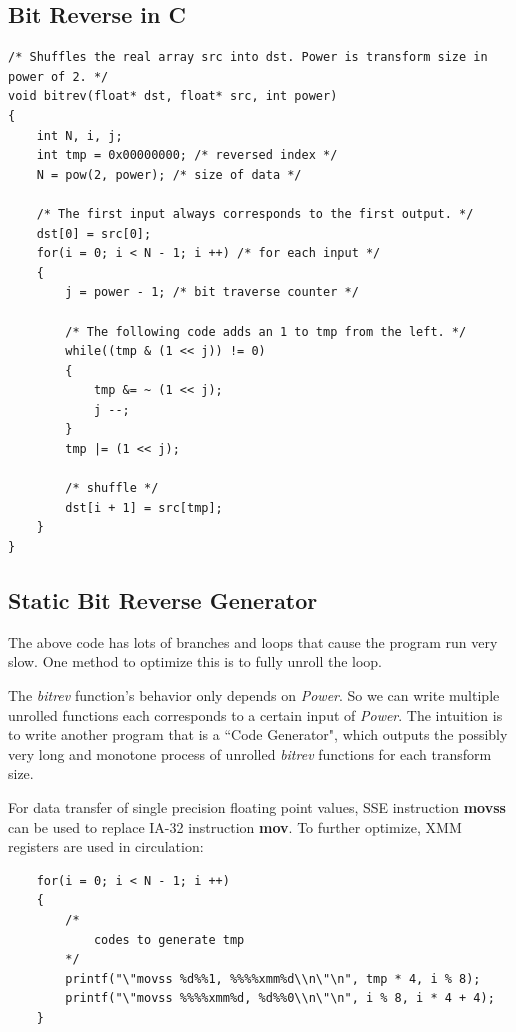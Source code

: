 \documentclass[a4paper]{report}
\begin{document}
\subsection{Bit Reverse in C} \indent

        \lstset{language = c, tabsize = 4}
        \begin{lstlisting}
/* Shuffles the real array src into dst. Power is transform size in power of 2. */
void bitrev(float* dst, float* src, int power)
{
    int N, i, j;
    int tmp = 0x00000000; /* reversed index */
    N = pow(2, power); /* size of data */
    
    /* The first input always corresponds to the first output. */
    dst[0] = src[0];
    for(i = 0; i < N - 1; i ++) /* for each input */
    {
        j = power - 1; /* bit traverse counter */
        
        /* The following code adds an 1 to tmp from the left. */
        while((tmp & (1 << j)) != 0)
        {
            tmp &= ~ (1 << j);
            j --;
        }
        tmp |= (1 << j);
        
        /* shuffle */
        dst[i + 1] = src[tmp];
    }
}
        \end{lstlisting}

\subsection{Static Bit Reverse Generator} \indent

	The above code has lots of branches and loops that cause the program run very slow. One method to optimize this is to fully unroll the loop.
	
	The \textit{bitrev} function's behavior only depends on \textit{Power}. So we can write multiple unrolled functions each corresponds to a certain input of \textit{Power}. The intuition is to write another program that is a ``Code Generator", which outputs the possibly very long and monotone process of unrolled \textit{bitrev} functions for each transform size.
	
	For data transfer of single precision floating point values, SSE instruction \textbf{movss} can be used to replace IA-32 instruction \textbf{mov}. To further optimize, XMM registers are used in circulation:

        \lstset{language = c, tabsize = 4}
        \begin{lstlisting}
    for(i = 0; i < N - 1; i ++)
    {
    	/*
    		codes to generate tmp
    	*/
        printf("\"movss %d%%1, %%%%xmm%d\\n\"\n", tmp * 4, i % 8);
        printf("\"movss %%%%xmm%d, %d%%0\\n\"\n", i % 8, i * 4 + 4);
	}
        \end{lstlisting}
\end{document}
